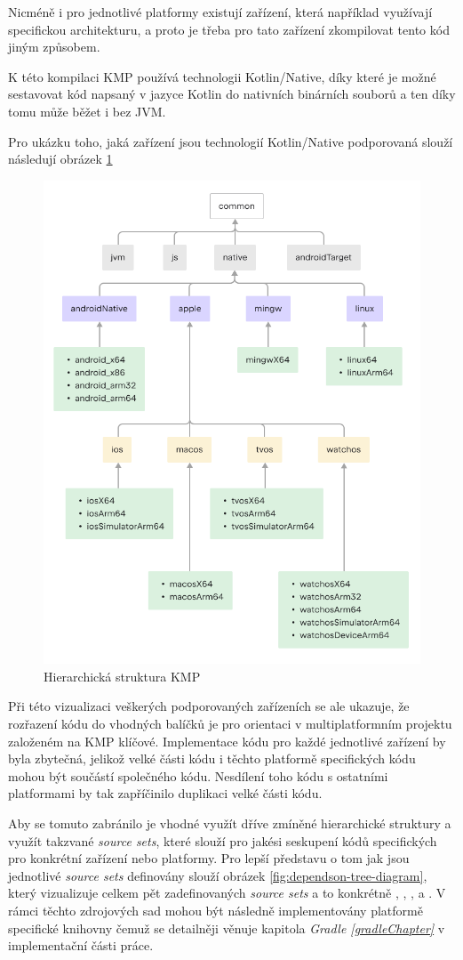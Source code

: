 Nicméně i pro jednotlivé platformy existují zařízení, která například využívají specifickou architekturu, a proto je třeba pro 
tato zařízení zkompilovat tento kód jiným způsobem.

K této kompilaci KMP používá technologii Kotlin/Native, díky které
je možné sestavovat kód napsaný v jazyce Kotlin do nativních binárních souborů a ten díky tomu může běžet i bez JVM. \cite{kotlinNative}

Pro ukázku toho, jaká zařízení jsou technologií Kotlin/Native podporovaná slouží následují obrázek \ref{fig:KMP_struktura}

\begin{figure}[H]
  \centering
  \includegraphics[width=.7\textwidth]{full-template-hierarchy.png}
  \caption{Hierarchická struktura KMP \cite{KMPHierarchi}}
  \label{fig:KMP_struktura}
\end{figure}

Při této vizualizaci veškerých podporovaných zařízeních se ale ukazuje, že rozřazení kódu do vhodných balíčků je pro orientaci v 
multiplatformním projektu založeném na KMP klíčové. Implementace kódu pro každé jednotlivé zařízení by byla zbytečná, jelikož
velké části kódu i těchto platformě specifických kódu mohou být součástí společného kódu. Nesdílení toho kódu s ostatními platformami
by tak zapříčinilo duplikaci velké části kódu. 

Aby se tomuto zabránilo je vhodné využít dříve zmíněné hierarchické struktury a využít takzvané \textit{source sets}, které slouží 
pro jakési seskupení kódů specifických pro konkrétní zařízení nebo platformy. Pro lepší představu o tom jak jsou jednotlivé
\textit{source sets} definovány slouží obrázek \ref{fig:dependson-tree-diagram},
který vizualizuje celkem pět zadefinovaných \textit{source sets} a to konkrétně , , 
,  a . V rámci těchto zdrojových sad mohou být následně implementovány
platformě specifické knihovny čemuž se detailněji věnuje kapitola \textit{Gradle \ref{gradleChapter}} v implementační části práce.

